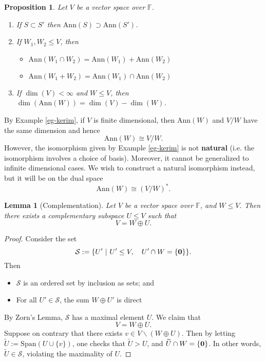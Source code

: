 \documentclass[12pt]{amsbook}
\newtheorem{lemma}[theorem]{Lemma}
\newtheorem{proposition}[theorem]{Proposition}
\begin{document}
\begin{proposition}
Let $V$ be a vector space over $\mathbb{F}$.
    \begin{enumerate}
        \item If $S \subset S'$ then $\mathrm{Ann}(S) \supset \mathrm{Ann}(S')$.
        \item If $W_1, W_2 \leq V$, then 
        \begin{itemize}
            \item $\mathrm{Ann}(W_1 \cap W_2) = \mathrm{Ann}(W_1) + \mathrm{Ann}(W_2)$
            \item $\mathrm{Ann}(W_1 + W_2) = \mathrm{Ann}(W_1) \cap \mathrm{Ann}(W_2)$
        \end{itemize}
        \item If $\dim(V) < \infty$ and $W \leq V$, then $\dim(\mathrm{Ann}(W)) = \dim(V) - \dim(W)$.
    \end{enumerate}
\end{proposition}
By Example \ref{eg-kerim}, if $V$ is finite dimensional, then $\mathrm{Ann}(W)$ and $V/W$ have the same dimension and hence 
$$\mathrm{Ann}(W) \cong V/W.$$
However, the isomorphism given by Example \ref{eg-kerim} is not {\bf natural} (i.e. the isomorphism involves a choice of basis). Moreover, it cannot be generalized to infinite dimensional cases. We wish to construct a natural isomorphism instead, but it will be on the dual space
$$\mathrm{Ann}(W) \cong (V/W)^*.$$

\begin{lemma}[Complementation]
    Let $V$ be a vector space over $\mathbb{F}$, and $W \leq V$. Then there exists a complementary subspace $U \leq V$ such that 
    $$V = W \oplus U.$$
\end{lemma}
\begin{proof}
    Consider the set
    $$\mathcal{S} := \{U'\ |\ U' \leq V, \quad U' \cap W = \{\bf 0\}\}.$$
    Then 
    \begin{itemize}
    \item $\mathcal{S}$ is an ordered set by inclusion as sets; and 
    \item For all $U' \in \mathcal{S}$, the sum $W \oplus U'$ is direct
    \end{itemize}
    By Zorn's Lemma, $\mathcal{S}$ has a maximal element $U$. We claim that 
    $$V = W \oplus U.$$
    Suppose on contrary that there exists $v \in V \backslash (W \oplus U)$. Then by letting $\widetilde{U} := \mathrm{Span}(U \cup \{v\})$, one checks that $\widetilde{U} > U$, and $\widetilde{U} \cap W = \{\bf 0\}$. 
    In other words, $\widetilde{U} \in \mathcal{S}$, violating the maximality of $U$.    
\end{proof}
\end{document}
